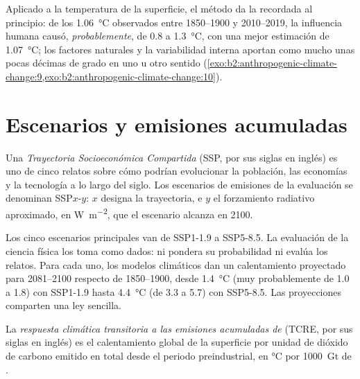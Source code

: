 Aplicado a la temperatura de la superficie, el método da la  recordada al principio: de los
\qty{1.06}{\celsius} observados entre 1850--1900 y 2010--2019, la influencia humana causó, \emph{probablemente},
de 0.8 a \qty{1.3}{\celsius}, con una mejor estimación de \qty{1.07}{\celsius}; los factores naturales y la
variabilidad interna aportan como mucho unas pocas décimas de grado en uno u otro sentido
(\cref{exo:b2:anthropogenic-climate-change:9,exo:b2:anthropogenic-climate-change:10}).

\section{Escenarios y emisiones acumuladas}\label{sec:b2:anthropogenic-climate-change:scenarios}

\begin{definition}\label{def:b2:anthropogenic-climate-change:ssp}
Una \emph{Trayectoria Socioeconómica Compartida} (SSP, por sus siglas en inglés) es uno de cinco
relatos sobre cómo podrían evolucionar la población, las economías y la tecnología a lo largo del siglo. Los
escenarios de emisiones de la evaluación se denominan SSP$x$-$y$: $x$ designa la trayectoria, e $y$ el
forzamiento radiativo aproximado, en \unit{W.m^{-2}}, que el escenario alcanza en 2100.
\end{definition}

Los cinco escenarios principales van de SSP1-1.9 a SSP5-8.5. La evaluación de la ciencia física los toma como
dados: ni pondera su probabilidad ni evalúa los relatos. Para cada uno, los modelos climáticos
dan un calentamiento proyectado para 2081--2100 respecto de 1850--1900, desde \qty{1.4}{\celsius} (muy probablemente de 1.0
a 1.8) con SSP1-1.9 hasta \qty{4.4}{\celsius} (de 3.3 a 5.7) con SSP5-8.5. Las proyecciones comparten una
ley sencilla.

\begin{definition}\label{def:b2:anthropogenic-climate-change:tcre}
La \emph{respuesta climática transitoria a las emisiones acumuladas de }
(TCRE, por sus siglas en inglés) es el calentamiento global de la superficie por unidad de dióxido
de carbono emitido en total desde el periodo preindustrial, en \unit{\celsius} por
\qty{1000}{Gt} de .
\end{definition}

